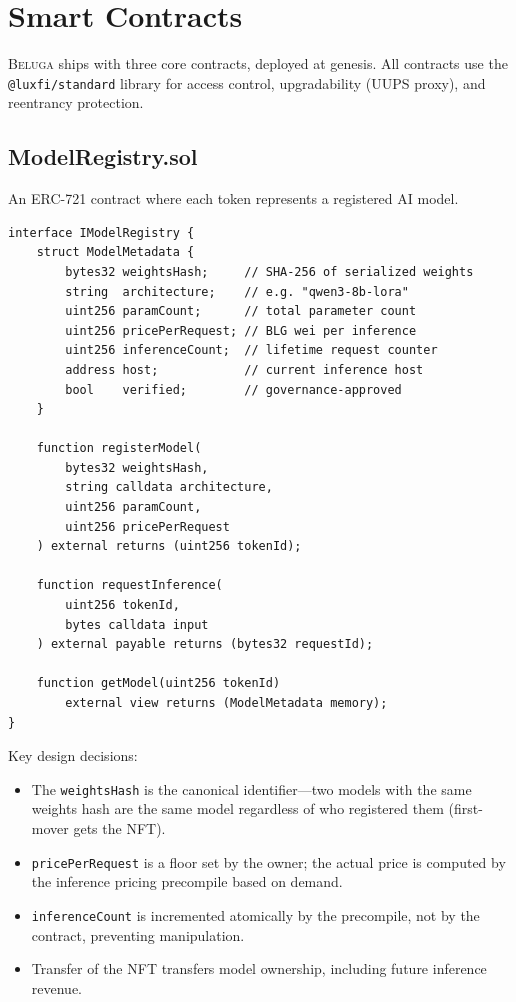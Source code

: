\documentclass[11pt,letterpaper]{article}
\newcommand{\Beluga}{\textsc{Beluga}}
\begin{document}
\section{Smart Contracts}\label{sec:contracts}

\Beluga{} ships with three core contracts, deployed at genesis. All contracts use the \texttt{@luxfi/standard} library \cite{lux-standard} for access control, upgradability (UUPS proxy), and reentrancy protection.

\subsection{ModelRegistry.sol}

An ERC-721 contract where each token represents a registered AI model.

\begin{lstlisting}[language=Solidity,caption=ModelRegistry core interface]
interface IModelRegistry {
    struct ModelMetadata {
        bytes32 weightsHash;     // SHA-256 of serialized weights
        string  architecture;    // e.g. "qwen3-8b-lora"
        uint256 paramCount;      // total parameter count
        uint256 pricePerRequest; // BLG wei per inference
        uint256 inferenceCount;  // lifetime request counter
        address host;            // current inference host
        bool    verified;        // governance-approved
    }

    function registerModel(
        bytes32 weightsHash,
        string calldata architecture,
        uint256 paramCount,
        uint256 pricePerRequest
    ) external returns (uint256 tokenId);

    function requestInference(
        uint256 tokenId,
        bytes calldata input
    ) external payable returns (bytes32 requestId);

    function getModel(uint256 tokenId)
        external view returns (ModelMetadata memory);
}
\end{lstlisting}

Key design decisions:
\begin{itemize}[nosep]
    \item The \texttt{weightsHash} is the canonical identifier---two models with the same weights hash are the same model regardless of who registered them (first-mover gets the NFT).
    \item \texttt{pricePerRequest} is a floor set by the owner; the actual price is computed by the inference pricing precompile based on demand.
    \item \texttt{inferenceCount} is incremented atomically by the precompile, not by the contract, preventing manipulation.
    \item Transfer of the NFT transfers model ownership, including future inference revenue.
\end{itemize}
\end{document}
